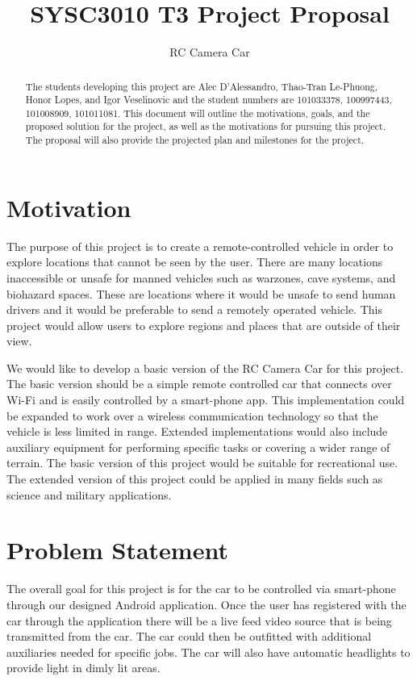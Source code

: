 \documentclass[letterpaper,12pt]{report}
\begin{document}
	\title{SYSC3010 T3 Project Proposal}
	\author{RC Camera Car}
	\date{}
	\maketitle

	\begin{abstract}
		The students developing this project are Alec D'Alessandro, Thao-Tran
		Le-Phuong, Honor Lopes, and Igor Veselinovic and the student numbers are
		101033378, 100997443, 101008909, 101011081. This document will outline
		the motivations, goals, and the proposed solution for the project, as
		well as the motivations for pursuing this project. The proposal will
		also provide the projected plan and milestones for the project.
	\end{abstract}

	\tableofcontents

	\pagebreak

	\section*{Motivation}
	\markright{}
	The purpose of this project is to create a remote-controlled vehicle in 
	order to explore locations that cannot be seen by the user. There are many
	locations inaccessible or unsafe for manned vehicles such as warzones, cave
	systems, and biohazard spaces. These are locations where it would be unsafe
	to send human drivers and it would be preferable to send a remotely operated
	vehicle. This project would allow users to explore regions and places that
	are outside of their view.

	We would like to develop a basic version of the RC Camera Car for this
	project. The basic version should be a simple remote controlled car that
	connects over Wi-Fi and is easily controlled by a smart-phone app. This
	implementation could be expanded to work over a wireless communication
	technology so that the vehicle is less limited in range. Extended
	implementations would also include auxiliary equipment for performing 
	specific tasks or covering a wider range of terrain. The basic version of 
	this project would be suitable for recreational use. The extended version of
	this project could be applied in many fields such as science and military 
	applications.


	\section*{Problem Statement}
	\markright{}
	The overall goal for this project is for the car to be controlled via
	smart-phone through our designed Android application. Once the user has
	registered with the car through the application there will be a live feed
	video source that is being transmitted from the car. The car could then be
	outfitted with additional auxiliaries needed for specific jobs. The car will
	also have automatic headlights to provide light in dimly lit areas.
\end{document}
